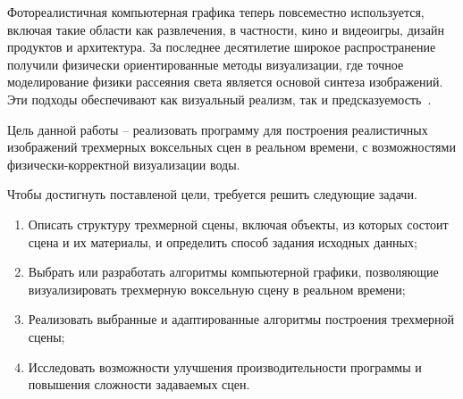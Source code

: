 Фотореалистичная компьютерная графика теперь повсеместно 
используется, включая такие области как развлечения, в частности, 
кино и видеоигры, дизайн продуктов и архитектура. За последнее 
десятилетие широкое распространение получили физически ориентированные 
методы визуализации, где точное моделирование физики рассеяния света 
является основой синтеза изображений. Эти подходы обеспечивают как 
визуальный реализм, так и предсказуемость~\cite{PBRT3e}.

Цель данной работы -- реализовать программу для построения 
реалистичных изображений трехмерных воксельных сцен в реальном времени,
с возможностями физически-корректной визуализации воды.

Чтобы достигнуть поставленой цели, требуется решить следующие задачи.

\begin{enumerate}[label*=---]
    \item Описать структуру трехмерной сцены, включая объекты, из которых
          состоит сцена и их материалы, и определить способ задания 
          исходных данных;
    \item Выбрать или разработать алгоритмы компьютерной 
          графики, позволяющие визуализировать трехмерную воксельную
          сцену в реальном времени;
    \item Реализовать выбранные и адаптированные алгоритмы построения 
          трехмерной сцены;
    \item Исследовать возможности улучшения производительности программы
          и повышения сложности задаваемых сцен.
\end{enumerate}
